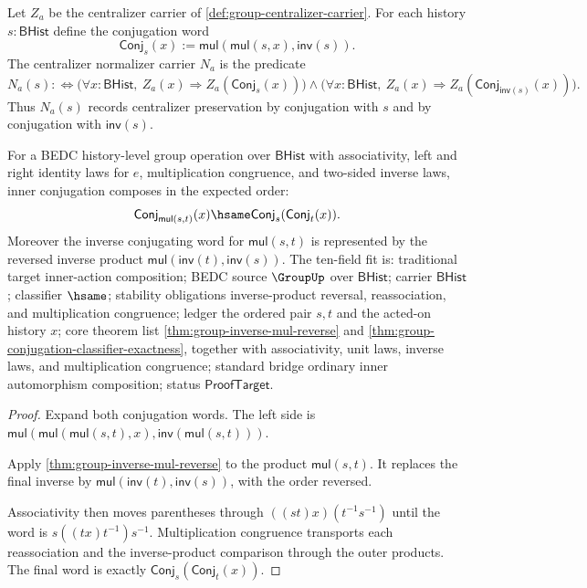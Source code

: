\begin{definition}
\label{def:group-centralizer-normalizer-carrier}
Let $Z_a$ be the centralizer carrier of
\autoref{def:group-centralizer-carrier}. For each history
$s:\mathsf{BHist}$ define the conjugation word
$$
\mathsf{Conj}_s(x):=
\mathsf{mul}(\mathsf{mul}(s,x),\mathsf{inv}(s)).
$$
The centralizer normalizer carrier $N_a$ is the predicate
$$
N_a(s) :\Longleftrightarrow
\bigl(\forall x:\mathsf{BHist},\ Z_a(x)\Rightarrow Z_a(\mathsf{Conj}_s(x))\bigr)
\land
\bigl(\forall x:\mathsf{BHist},\ Z_a(x)\Rightarrow
Z_a(\mathsf{Conj}_{\mathsf{inv}(s)}(x))\bigr).
$$
Thus $N_a(s)$ records centralizer preservation by conjugation with $s$ and by
conjugation with $\mathsf{inv}(s)$.
\end{definition}

\begin{theorem}
\label{thm:group-conjugation-composition}
For a BEDC history-level group operation over $\mathsf{BHist}$ with
associativity, left and right identity laws for $e$, multiplication
congruence, and two-sided inverse laws, inner conjugation composes in the
expected order:
$$
\mathsf{Conj}_{\mathsf{mul}(s,t)}(x)
\hsame
\mathsf{Conj}_s(\mathsf{Conj}_t(x)).
$$
Moreover the inverse conjugating word for $\mathsf{mul}(s,t)$ is represented by
the reversed inverse product $\mathsf{mul}(\mathsf{inv}(t),\mathsf{inv}(s))$.
The ten-field fit is: traditional target inner-action composition; BEDC source
$\GroupUp$ over $\mathsf{BHist}$; carrier $\mathsf{BHist}$; classifier
$\hsame$; stability obligations inverse-product reversal, reassociation, and
multiplication congruence; ledger the ordered pair $s,t$ and the acted-on
history $x$; core theorem list \autoref{thm:group-inverse-mul-reverse} and
\autoref{thm:group-conjugation-classifier-exactness}, together with
associativity, unit laws, inverse laws, and multiplication congruence; standard
bridge ordinary inner automorphism composition; status $\mathsf{ProofTarget}$.
\end{theorem}
\begin{proof}
Expand both conjugation words. The left side is
$\mathsf{mul}(\mathsf{mul}(\mathsf{mul}(s,t),x),
\mathsf{inv}(\mathsf{mul}(s,t)))$.

Apply \autoref{thm:group-inverse-mul-reverse} to the product
$\mathsf{mul}(s,t)$. It replaces the final inverse by
$\mathsf{mul}(\mathsf{inv}(t),\mathsf{inv}(s))$, with the order reversed.

Associativity then moves parentheses through
$((s t)x)(t^{-1}s^{-1})$ until the word is
$s((t x)t^{-1})s^{-1}$. Multiplication congruence transports each
reassociation and the inverse-product comparison through the outer products.
The final word is exactly $\mathsf{Conj}_s(\mathsf{Conj}_t(x))$.
\end{proof}

